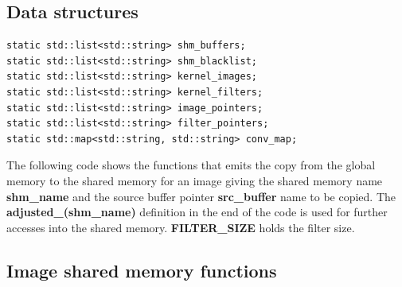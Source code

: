 \documentclass{article}
\begin{document}
\subsection{Data structures}

\begin{verbatim}
static std::list<std::string> shm_buffers;
static std::list<std::string> shm_blacklist;
static std::list<std::string> kernel_images;
static std::list<std::string> kernel_filters;
static std::list<std::string> image_pointers;
static std::list<std::string> filter_pointers;
static std::map<std::string, std::string> conv_map;
\end{verbatim}

The following code shows the functions that emits the copy from the global memory to the shared memory for an image giving the shared memory name \textbf{shm\_name} and the source buffer pointer \textbf{src\_buffer} name to be copied. The \textbf{adjusted\_(shm\_name)} definition in the end of the code is used for further accesses into the shared memory. \textbf{FILTER\_SIZE} holds the filter size.

\pagebreak

\subsection{Image shared memory functions}
\end{document}
